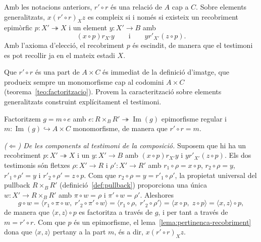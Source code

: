 \begin{proposicio}\label{prop:composicio-es-relacio}
Amb les notacions anteriors, \(r'\circ r\) és una relació de \(A\) cap a
\(C\). Sobre elements generalitzats, \(x\mathrel{(r'\circ r)_X}z\) es
compleix si i només si existeix un recobriment epimòrfic
\(p\colon X'\twoheadrightarrow X\) i un element \(y\colon X'\to B\) amb
\[
(x\circ p)\mathrel{r_{X'}}y
\qquad\text{i}\qquad
y\mathrel{r'_{X'}}(z\circ p).
\]
Amb l'axioma d'elecció, el recobriment \(p\) és escindit, de manera que el
testimoni es pot recollir ja en el mateix estadi \(X\).
\end{proposicio}

\begin{prova}
Que \(r'\circ r\) és una part de \(A\times C\) és immediat de la
definició d'imatge, que produeix sempre un monomorfisme cap al codomini
\(A\times C\) (teorema~\ref{teo:factoritzacio}). Provem la caracterització
sobre elements generalitzats construint explícitament el testimoni.

Factoritzem \(g=m\circ e\) amb \(e\colon R\times_B R'\twoheadrightarrow
\operatorname{Im}(g)\) epimorfisme regular i
\(m\colon\operatorname{Im}(g)\hookrightarrow A\times C\) monomorfisme, de
manera que \(r'\circ r=m\).

\emph{(\(\Leftarrow\)) De les components al testimoni de la composició.}
Suposem que hi ha un recobriment \(p\colon X'\twoheadrightarrow X\) i un
\(y\colon X'\to B\) amb \((x\circ p)\mathrel{r_{X'}}y\) i
\(y\mathrel{r'_{X'}}(z\circ p)\). Els dos testimonis són fletxes
\(\rho\colon X'\to R\) i \(\rho'\colon X'\to R'\) amb
\(r_1\circ\rho=x\circ p\), \(r_2\circ\rho=y\), \(r'_1\circ\rho'=y\) i
\(r'_2\circ\rho'=z\circ p\). Com que \(r_2\circ\rho=y=r'_1\circ\rho'\), la
propietat universal del pullback \(R\times_B R'\) (definició~\ref{def:pullback})
proporciona una única \(w\colon X'\to R\times_B R'\) amb \(\pi\circ w=\rho\)
i \(\pi'\circ w=\rho'\). Aleshores
\[
g\circ w=\langle r_1\circ\pi\circ w,\;r'_2\circ\pi'\circ w\rangle
=\langle r_1\circ\rho,\;r'_2\circ\rho'\rangle
=\langle x\circ p,\;z\circ p\rangle=\langle x,z\rangle\circ p,
\]
de manera que \(\langle x,z\rangle\circ p\) es factoritza a través de
\(g\), i per tant a través de \(m=r'\circ r\). Com que \(p\) és un
epimorfisme, el lema~\ref{lema:pertinenca-recobriment} dona que
\(\langle x,z\rangle\) pertany a la part \(m\), és a dir,
\(x\mathrel{(r'\circ r)_X}z\).


\end{prova}
